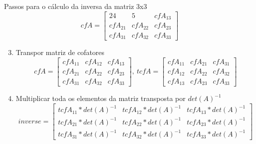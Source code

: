 \documentclass[10pt]{beamer}
\begin{document}
\begin{frame}[fragile]{Passos para o cálculo da inversa da matriz 3x3}
  \[
    cfA = \begin{bmatrix}
          24      &     5       & cfA_{13} \\
      cfA_{21} & cfA_{22} & cfA_{23} \\
      cfA_{31} & cfA_{32} & cfA_{33}
    \end{bmatrix}
  \]

  \begin{enumerate}
    \setcounter{enumi}{2}
    \item Transpor matriz de cofatores
    \[
      cfA = \begin{bmatrix}
        cfA_{11} & cfA_{12} & cfA_{13} \\
        cfA_{21} & cfA_{22} & cfA_{23} \\
        cfA_{31} & cfA_{32} & cfA_{33}
      \end{bmatrix},  
      \: tcfA = \begin{bmatrix}
        cfA_{11} & cfA_{21} & cfA_{31} \\
        cfA_{12} & cfA_{22} & cfA_{32} \\
        cfA_{13} & cfA_{23} & cfA_{33}
      \end{bmatrix}  
    \]
    \item Multiplicar toda os elementos da matriz transposta por $det(A)^{-1}$
    \[  
      inverse = \begin{bmatrix}
        tcfA_{11}*det(A)^{-1} & tcfA_{12}*det(A)^{-1} & tcfA_{13}*det(A)^{-1} \\
        tcfA_{21}*det(A)^{-1} & tcfA_{22}*det(A)^{-1} & tcfA_{23}*det(A)^{-1} \\
        tcfA_{31}*det(A)^{-1} & tcfA_{32}*det(A)^{-1} & tcfA_{33}*det(A)^{-1}
      \end{bmatrix}  
    \]
  \end{enumerate}

\end{frame}
\end{document}
